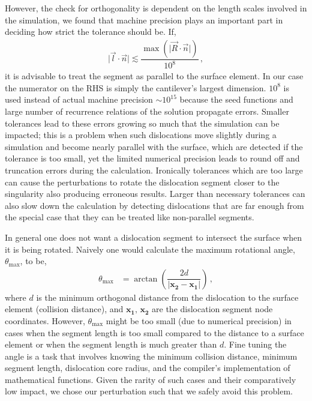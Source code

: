\documentclass[11pt]{iopart}
\begin{document}
However, the check for orthogonality is dependent on the length scales involved in the simulation, we found that machine precision plays an important part in deciding how strict the tolerance should be. If,
%
\begin{align}
    \lvert\vec{l}\cdot\vec{n}\rvert \lesssim \dfrac{\max\left(\lvert\vec{R}\cdot\vec{n}\rvert\right)}{10^8}\,,
\end{align}
%
it is advisable to treat the segment as parallel to the surface element. In our case the numerator on the RHS is simply the cantilever's largest dimension. $10^8$ is used instead of actual machine precision $\sim10^{15}$ because the seed functions and large number of recurrence relations of the solution propagate errors. Smaller tolerances lead to these errors growing so much that the simulation can be impacted; this is a problem when such dislocations move slightly during a simulation and become nearly parallel with the surface, which are detected if the tolerance is too small, yet the limited numerical precision leads to round off and truncation errors during the calculation. Ironically tolerances which are too large can cause the perturbations to rotate the dislocation segment closer to the singularity also producing erroneous results. Larger than necessary tolerances can also slow down the calculation by detecting dislocations that are far enough from the special case that they can be treated like non-parallel segments.

In general one does not want a dislocation segment to intersect the surface when it is being rotated. Naively one would calculate the maximum rotational angle, $\theta_{\textrm{max}}$, to be,
%
\begin{align}
    \theta_{\textrm{max}} & = \arctan\left(\dfrac{2 d}{\left\lvert\mathbf{x_2} - \mathbf{x_1}\right\rvert}\right)\,,
\end{align}
%
where $d$ is the minimum orthogonal distance from the dislocation to the surface element (collision distance), and $\mathbf{x_1},\,\mathbf{x_2}$ are the dislocation segment node coordinates. However, $\theta_\textrm{max}$ might be too small (due to numerical precision) in cases when the segment length is too small compared to the distance to a surface element or when the segment length is much greater than $d$. Fine tuning the angle is a task that involves knowing the minimum collision distance, minimum segment length, dislocation core radius, and the compiler's implementation of mathematical functions. Given the rarity of such cases and their comparatively low impact, we chose our perturbation such that we safely avoid this problem.
\end{document}
